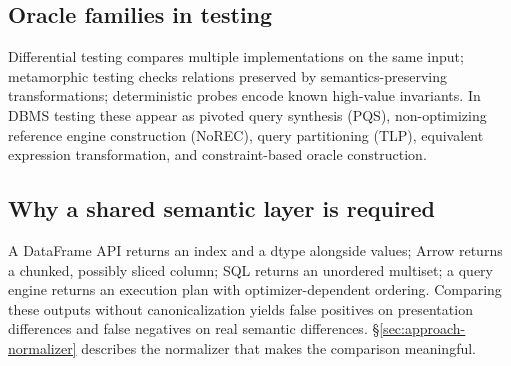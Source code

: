 \subsection{Oracle families in testing}

Differential testing compares multiple implementations on the same input; metamorphic testing
checks relations preserved by semantics-preserving transformations; deterministic probes encode
known high-value invariants. In DBMS testing these appear as pivoted query synthesis (PQS),
non-optimizing reference engine construction (NoREC), query partitioning (TLP), equivalent
expression transformation, and constraint-based oracle construction. 

\subsection{Why a shared semantic layer is required}

A DataFrame API returns an index and a dtype alongside values; Arrow returns a chunked,
possibly sliced column; SQL returns an unordered multiset; a query engine returns an execution
plan with optimizer-dependent ordering. Comparing these outputs without canonicalization
yields false positives on presentation differences and false negatives on real semantic
differences. \S\ref{sec:approach-normalizer} describes the normalizer that makes the
comparison meaningful.
